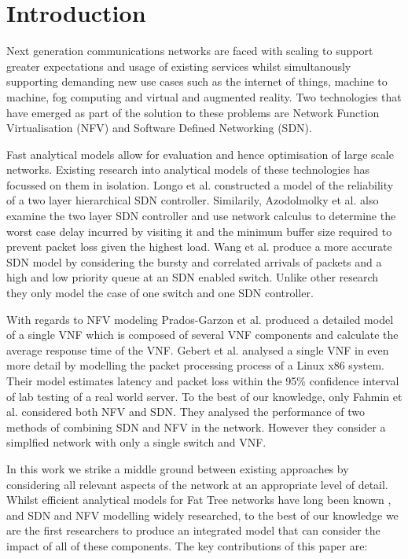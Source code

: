 
\section{Introduction}
\label{sec:introduction}

Next generation communications networks are faced with scaling to support greater expectations and usage of existing services whilst simultanously supporting demanding new use cases such as the internet of things, machine to machine, fog computing and virtual and augmented reality. Two technologies that have emerged as part of the solution to these problems are Network Function Virtualisation (NFV) and Software Defined Networking (SDN).

Fast analytical models allow for evaluation and hence optimisation of large scale networks. Existing research into analytical models of these technologies has focussed on them in isolation. Longo et al. \cite{LongoDBS15} constructed a model of the reliability of a two layer hierarchical SDN controller. Similarily, Azodolmolky et al. \cite{AzodolmolkyWY13} also examine the two layer SDN controller and use network calculus to determine the worst case delay incurred by visiting it and the minimum buffer size required to prevent packet loss given the highest load. Wang et al. \cite{MiaoMWWH16} produce a more accurate SDN model by considering the bursty and correlated arrivals of packets and a high and low priority queue at an SDN enabled switch. Unlike other research they only model the case of one switch and one SDN controller.

With regards to NFV modeling Prados-Garzon et al. \cite{Prados-GarzonAR17} produced a detailed model of a single VNF which is composed of several VNF components and calculate the average response time of the VNF. Gebert et al. \cite{GebertZLST16} analysed a single VNF in even more detail by modelling the packet processing process of a Linux x86 system. Their model estimates latency and packet loss within the 95\% confidence interval of lab testing of a real world server. To the best of our knowledge, only Fahmin et al. \cite{FahminLHLS17} considered both NFV and SDN. They analysed the performance of two methods of combining SDN and NFV in the network. However they consider a simplfied network with only a single switch and VNF.

In this work we strike a middle ground between existing approaches by considering all relevant aspects of the network at an appropriate level of detail. Whilst efficient analytical models for Fat Tree networks have long been known \cite{GreenbergG97}, and SDN and NFV modelling widely researched, to the best of our knowledge we are the first researchers to produce an integrated model that can consider the impact of all of these components. The key contributions of this paper are:

